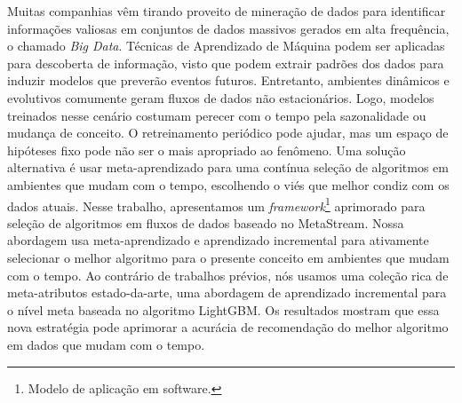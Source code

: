 Muitas companhias vêm tirando proveito de mineração de dados para identificar informações valiosas em conjuntos de dados massivos gerados em alta frequência, o chamado \textit{Big Data}. Técnicas de Aprendizado de Máquina podem ser aplicadas para descoberta de informação, visto que podem extrair padrões dos dados para induzir modelos que preverão eventos futuros. Entretanto, ambientes dinâmicos e evolutivos comumente geram fluxos de dados não estacionários. Logo, modelos treinados nesse cenário costumam perecer com o tempo pela sazonalidade ou mudança de conceito. O retreinamento periódico pode ajudar, mas um espaço de hipóteses fixo pode não ser o mais apropriado ao fenômeno. Uma solução alternativa é usar meta-aprendizado para uma contínua seleção de algoritmos em ambientes que mudam com o tempo, escolhendo o viés que melhor condiz com os dados atuais. Nesse trabalho, apresentamos um \textit{framework}\footnote{Modelo de aplicação em software.} aprimorado para seleção de algoritmos em fluxos de dados baseado no MetaStream. Nossa abordagem usa meta-aprendizado e aprendizado incremental para ativamente selecionar o melhor algoritmo para o presente conceito em ambientes que mudam com o tempo. Ao contrário de trabalhos prévios, nós usamos uma coleção rica de meta-atributos estado-da-arte, uma abordagem de aprendizado incremental para o nível meta baseada no algoritmo LightGBM. Os resultados mostram que essa nova estratégia pode aprimorar a acurácia de recomendação do melhor algoritmo em dados que mudam com o tempo.